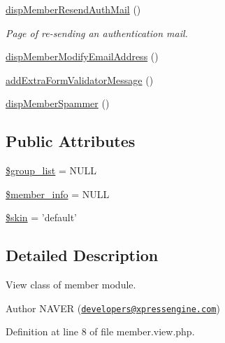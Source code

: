 \begin{DoxyCompactItemize}
\hyperlink{classmemberView_a6796539153aa0a8deda927e51ba302ed}{disp\+Member\+Resend\+Auth\+Mail} ()
\begin{DoxyCompactList}\small\item\em Page of re-\/sending an authentication mail. \end{DoxyCompactList}\item 
\hyperlink{classmemberView_ac89f9f6436c7d195835d091960f5d113}{disp\+Member\+Modify\+Email\+Address} ()
\item 
\hyperlink{classmemberView_a7500578f8585e5875626ea613763d22b}{add\+Extra\+Form\+Validator\+Message} ()
\item 
\hyperlink{classmemberView_a89f56007be451ba8c4136a2e25d343ec}{disp\+Member\+Spammer} ()
\end{DoxyCompactItemize}
\subsection*{Public Attributes}
\begin{DoxyCompactItemize}
\item 
\hyperlink{classmemberView_a8a34ae05d48f3e4471f073c7b6094a19}{\$group\+\_\+list} = N\+U\+L\+L
\item 
\hyperlink{classmemberView_a435c30d8223b51ac6b6a568142dc6c2e}{\$member\+\_\+info} = N\+U\+L\+L
\item 
\hyperlink{classmemberView_a01171d2b82e91a06754a9f8c52af6962}{\$skin} = 'default'
\end{DoxyCompactItemize}


\subsection{Detailed Description}
View class of member module. 

\begin{DoxyAuthor}{Author}
N\+A\+V\+E\+R (\href{mailto:developers@xpressengine.com}{\tt developers@xpressengine.\+com}) 
\end{DoxyAuthor}


Definition at line 8 of file member.\+view.\+php.



